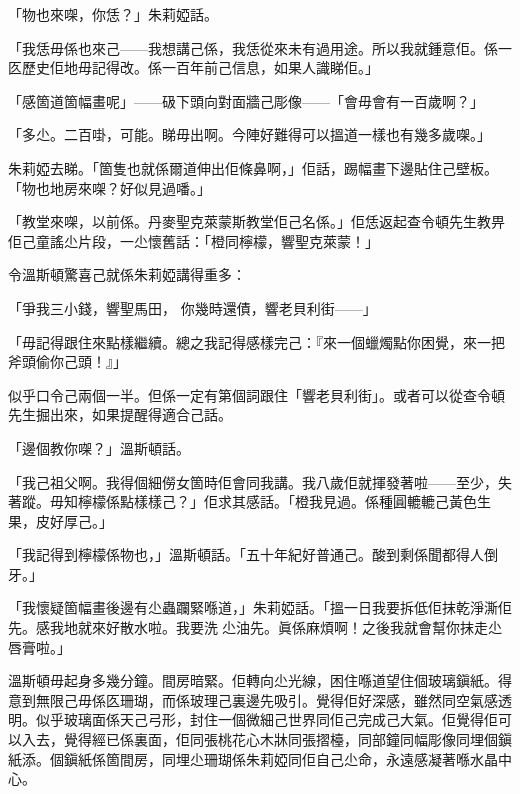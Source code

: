 「物也來㗎，你恁？」朱莉婭話。

「我恁毋係也來己——我想講己係，我恁從來未有過用途。所以我就鍾意佢。係一匛歷史佢地毋記得改。係一百年前己信息，如果人識睇佢。」

「感箇道箇幅畫呢」——砐下頭向對面牆己彫像——「會毋會有一百歲啊？」

「多尐。二百啩，可能。睇毋出啊。今陣好難得可以搵道一樣也有幾多歲㗎。」

朱莉婭去睇。「箇隻也就係爾道伸出佢條鼻啊，」佢話，踢幅畫下邊貼住己壁板。「物也地房來㗎？好似見過噃。」

「教堂來㗎，以前係。丹麥聖克萊蒙斯教堂佢己名係。」佢恁返起查令頓先生教畀佢己童謠尐片段，一尐懷舊話：「橙同檸檬，響聖克萊蒙！」

令溫斯頓驚喜己就係朱莉婭講得重多：

「爭我三小錢，響聖馬田，
你幾時還債，響老貝利街——」

「毋記得跟住來點樣繼續。總之我記得感樣完己：『來一個蠟燭點你困覺，來一把斧頭偷你己頭！』」

似乎口令己兩個一半。但係一定有第個詞跟住「響老貝利街」。或者可以從查令頓先生掘出來，如果提醒得適合己話。

「邊個教你㗎？」溫斯頓話。

「我己祖父啊。我得個細僗女箇時佢會同我講。我八歲佢就揮發著啦——至少，失著蹤。毋知檸檬係點樣樣己？」佢求其感話。「橙我見過。係種圓轆轆己黃色生果，皮好厚己。」

「我記得到檸檬係物也，」溫斯頓話。「五十年紀好普通己。酸到剩係聞都得人倒牙。」

「我懷疑箇幅畫後邊有尐蟲躝緊喺道，」朱莉婭話。「搵一日我要拆低佢抹乾淨澌佢先。感我地就來好散水啦。我要洗𠞉尐油先。眞係麻煩啊！之後我就會幫你抹走尐唇膏啦。」

溫斯頓毋起身多幾分鐘。間房暗緊。佢轉向尐光線，困住喺道望住個玻璃鎭紙。得意到無限己毋係匛珊瑚，而係玻理己裏邊先吸引。覺得佢好深感，雖然同空氣感透明。似乎玻璃面係天己弓形，封住一個微細己世界同佢己完成己大氣。佢覺得佢可以入去，覺得經已係裏面，佢同張桃花心木牀同張摺檯，同部鐘同幅彫像同埋個鎭紙添。個鎭紙係箇間房，同埋尐珊瑚係朱莉婭同佢自己尐命，永遠感凝著喺水晶中心。
